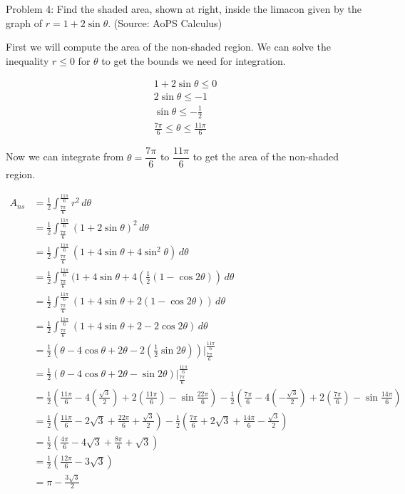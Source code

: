 Problem 4: Find the shaded area, shown at right, inside the limacon given by the graph of $r = 1 + 2 \sin \theta$. (Source: AoPS Calculus)

First we will compute the area of the non-shaded region. We can solve the inequality $r \leq 0$ for $\theta$ to get the bounds we need for integration.

\begin{align*}
1 + 2 \sin \theta \leq 0 \\
2 \sin \theta \leq -1 \\
\sin \theta \leq -\frac{1}{2} \\
\frac{7\pi}{6} \leq \theta \leq \frac{11\pi}{6}
\end{align*}

Now we can integrate from $\theta = \dfrac{7\pi}{6}$ to $\dfrac{11\pi}{6}$ to get the area of the non-shaded region.

\begin{align*}
A_{ns} &= \frac{1}{2} \int_{\frac{7\pi}{6}}^{\frac{11\pi}{6}} r^2 \, d\theta \\ 
&= \frac{1}{2} \int_{\frac{7\pi}{6}}^{\frac{11\pi}{6}} (1 + 2 \sin \theta)^2 \, d\theta \\ 
&= \frac{1}{2} \int_{\frac{7\pi}{6}}^{\frac{11\pi}{6}} (1 + 4 \sin \theta + 4 \sin ^2 \theta) \, d\theta \\ 
&= \frac{1}{2} \int_{\frac{7\pi}{6}}^{\frac{11\pi}{6}} (1 + 4 \sin \theta + 4(\frac{1}{2}(1 - \cos 2\theta)) \, d\theta \\ 
&= \frac{1}{2} \int_{\frac{7\pi}{6}}^{\frac{11\pi}{6}} (1 + 4 \sin \theta + 2(1 - \cos 2\theta)) \, d\theta \\ 
&= \frac{1}{2} \int_{\frac{7\pi}{6}}^{\frac{11\pi}{6}} (1 + 4 \sin \theta + 2 - 2 \cos 2\theta) \, d\theta \\ 
&= \frac{1}{2} \left(\theta - 4 \cos \theta + 2\theta - 2 (\frac{1}{2} \sin 2\theta) \right) \Bigg|_{\frac{7\pi}{6}}^{\frac{11\pi}{6}} \\ 
&= \frac{1}{2} \left(\theta - 4 \cos \theta + 2\theta - \sin 2\theta \right) \Bigg|_{\frac{7\pi}{6}}^{\frac{11\pi}{6}} \\ 
&= \frac{1}{2} \left(\frac{11\pi}{6}- 4(\frac{\sqrt 3}{2}) + 2(\frac{11\pi}{6}) - \sin \frac{22\pi}{6} \right) - \frac{1}{2} \left(\frac{7\pi}{6}- 4(-\frac{\sqrt 3}{2}) + 2(\frac{7\pi}{6}) - \sin \frac{14\pi}{6} \right) \\
&= \frac{1}{2} \left(\frac{11\pi}{6} - 2\sqrt{3} + \frac{22\pi}{6} + \frac{\sqrt3}{2} \right) - \frac{1}{2} \left(\frac{7\pi}{6} + 2\sqrt{3} + \frac{14\pi}{6} - \frac{\sqrt 3}{2} \right) \\ 
&= \frac{1}{2} \left(\frac{4\pi}{6} - 4\sqrt{3} + \frac{8\pi}{6} + \sqrt 3 \right) \\
&= \frac{1}{2} \left(\frac{12\pi}{6} - 3\sqrt{3} \right) \\
&= \pi - \frac{3 \sqrt 3}{2}
\end{align*}

